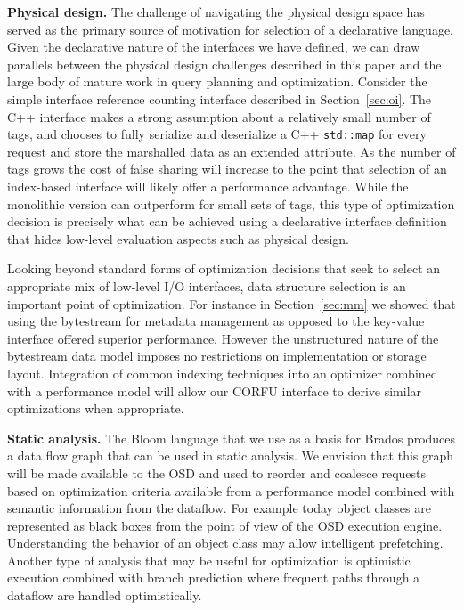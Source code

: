 \documentclass[10pt,twocolumn]{article}
\begin{document}
{\bf Physical design.} The challenge of navigating the physical design space
has served as the primary source of motivation for selection of a declarative
language. Given the declarative nature of the interfaces we have defined,
we can draw parallels between the physical design challenges described in this
paper and the
large body of mature work in query planning and optimization. Consider the
simple interface reference counting interface described in
Section~\ref{sec:oi}.  The C++ interface makes a strong assumption about a
relatively small number of tags, and chooses to fully serialize and
deserialize a C++ \texttt{std::map} for every request and store the marshalled
data as an extended attribute.  As the number of tags grows the cost of false
sharing will increase to the point that selection of an index-based interface
will likely offer a performance advantage. While the monolithic version can
outperform for small sets of tags, this type of optimization decision is
precisely what can be achieved using a declarative interface definition that
hides low-level evaluation aspects such as physical design.

Looking beyond standard forms of optimization decisions that seek to select
an appropriate mix of low-level I/O interfaces, data structure selection is an
important point of optimization. For instance in Section~\ref{sec:mm} we
showed that using the bytestream for metadata management as opposed to the
key-value interface offered superior performance. However the unstructured
nature of the bytestream data model imposes no restrictions on implementation
or storage layout. Integration of common indexing techniques into an optimizer
combined with a performance model will allow our CORFU interface to derive
similar optimizations when appropriate.

{\bf Static analysis.} The Bloom language that we use as a basis for Brados
produces a data flow graph that can be used in static analysis. We envision
that this graph will be made available to the OSD and used to reorder and
coalesce requests based on optimization criteria available from a performance
model combined with semantic information from the dataflow. For example today
object classes are represented as black boxes from the point of view of the
OSD execution engine.  Understanding the behavior of an object class may allow
intelligent prefetching. Another type of analysis that may be useful for
optimization is optimistic execution combined with branch prediction where
frequent paths through a dataflow are handled optimistically.
\end{document}

